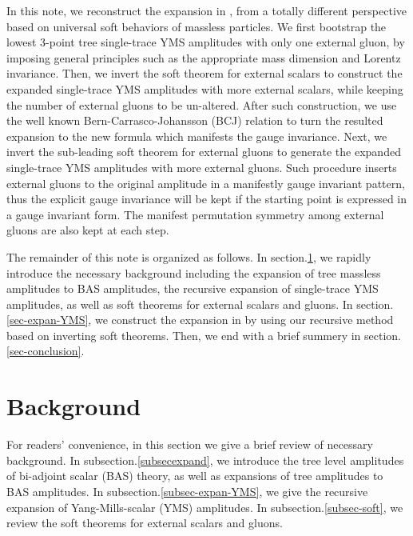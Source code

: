 \documentclass[preprint,showpacs,onecolumn,nofootinbib]{revtex4}
\begin{document}
In this note, we reconstruct the expansion in \cite{Cheung:2021zvb}, from a totally different perspective based on universal soft behaviors of massless particles. We first bootstrap the lowest $3$-point tree single-trace YMS amplitudes with only one external gluon, by imposing general principles such as the appropriate mass dimension and Lorentz invariance. Then, we invert the soft theorem for external scalars to construct the expanded single-trace YMS amplitudes with more external scalars, while keeping the number of external gluons to be un-altered. After such construction, we use the well known Bern-Carrasco-Johansson (BCJ) relation \cite{Bern:2008qj,Chiodaroli:2014xia,Johansson:2015oia,Johansson:2019dnu} to turn the resulted expansion to the new formula which manifests the gauge invariance. Next, we invert the sub-leading soft theorem for external gluons to generate the expanded single-trace YMS amplitudes with more external gluons. Such procedure inserts external gluons to the original amplitude in a manifestly gauge invariant pattern, thus
the explicit gauge invariance will be kept if the starting point is expressed in a gauge invariant form. The manifest permutation symmetry among external gluons are also kept at each step.

The remainder of this note is organized as follows. In section.\ref{sec-background}, we rapidly introduce the necessary background including the expansion of tree massless amplitudes to BAS amplitudes, the recursive expansion of single-trace YMS amplitudes, as well as soft theorems for external scalars and gluons. In section.\ref{sec-expan-YMS}, we construct the expansion in \cite{Cheung:2021zvb} by using our recursive method based on inverting soft theorems. Then, we end with a brief summery in section.\ref{sec-conclusion}.





\section{Background}
\label{sec-background}

For readers' convenience, in this section we give a brief review of necessary background. In subsection.\ref{subsecexpand}, we introduce the tree level amplitudes of bi-adjoint scalar (BAS) theory, as well as expansions of tree amplitudes to BAS amplitudes. In subsection.\ref{subsec-expan-YMS}, we give the recursive expansion of Yang-Mills-scalar (YMS) amplitudes. In subsection.\ref{subsec-soft}, we review the soft theorems for external scalars and gluons.
\end{document}
